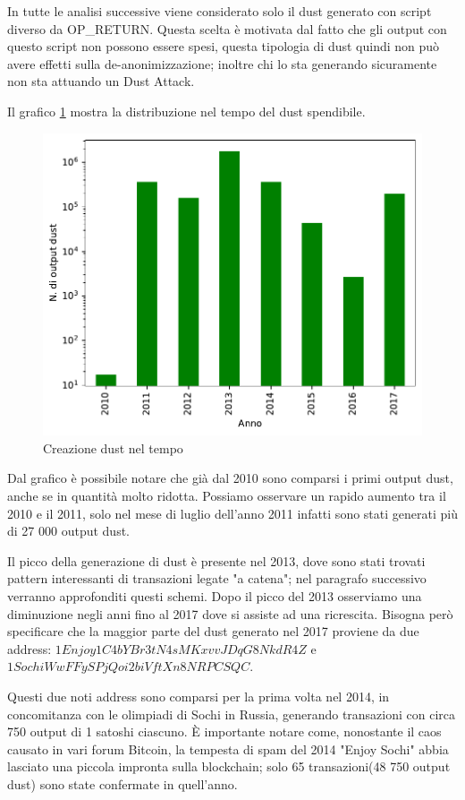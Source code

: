 In tutte le analisi successive viene considerato solo il dust generato con script diverso da OP\_RETURN. Questa scelta è motivata dal fatto che gli output con questo script non possono essere spesi, questa tipologia di dust quindi non può avere effetti sulla de-anonimizzazione; inoltre chi lo sta generando sicuramente non sta attuando un Dust Attack.

Il grafico \ref{fig:dust_created} mostra la distribuzione nel tempo del dust spendibile.
\begin{figure}[h!]
    \centering
    \includegraphics[scale=0.9]{Grafici/dust_created_year.pdf}
    \caption{Creazione dust nel tempo}
    \label{fig:dust_created}
\end{figure}
\FloatBarrier 
Dal grafico è possibile notare che già dal 2010 sono comparsi i primi output dust, anche se in quantità molto ridotta. Possiamo osservare un rapido aumento tra il 2010 e il 2011, solo nel mese di luglio dell'anno 2011 infatti sono stati generati più di 27 000 output dust.

Il picco della generazione di dust è presente nel 2013, dove sono stati trovati pattern interessanti di transazioni legate "a catena"; nel paragrafo successivo verranno approfonditi questi schemi. Dopo il picco del 2013 osserviamo una diminuzione negli anni fino al 2017 dove si assiste ad una ricrescita. Bisogna però specificare che la maggior parte del dust generato nel 2017 proviene da due address: $1Enjoy1C4bYBr3tN4sMKxvvJDqG8NkdR4Z$ e $1SochiWwFFySPjQoi2biVftXn8NRPCSQC$.

Questi due noti address sono comparsi per la prima volta nel 2014, in concomitanza con le olimpiadi di Sochi in Russia, generando transazioni con circa 750 output di 1 satoshi ciascuno. È importante notare come, nonostante il caos causato in vari forum Bitcoin, la tempesta di spam del 2014 "Enjoy Sochi" abbia lasciato una piccola impronta sulla blockchain; solo 65 transazioni(48 750 output dust) sono state confermate in quell'anno.

